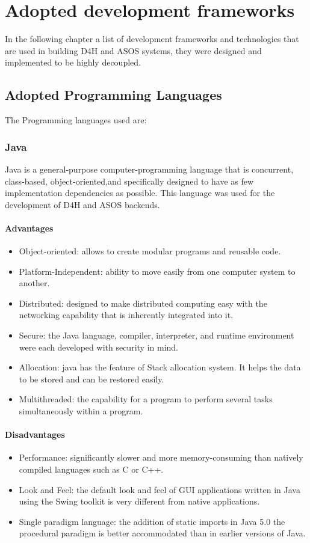 \documentclass[a4paper, hidelinks, 12pt]{report}
\begin{document}
	\chapter{Adopted development frameworks}
In the following chapter a list of development frameworks and technologies that are used in building  D4H and ASOS systems, they were designed and implemented to be highly decoupled.

	\section{Adopted Programming Languages}
	The Programming languages used are:

	\subsection{Java} Java is a general-purpose computer-programming language that is concurrent, class-based, object-oriented,and specifically designed to have as few implementation dependencies as possible. This language was used for the development of D4H and ASOS backends.

	\subsubsection{Advantages}
	\begin{itemize}
	\item{Object-oriented}: allows to create modular programs and reusable code.
	\item{Platform-Independent}: ability to move easily from one computer system to another.
		\item{Distributed}: designed to make distributed computing easy with the networking capability that is inherently integrated into it.
		\item{Secure}: the Java language, compiler, interpreter, and runtime environment were each developed with security in mind.
		\item{Allocation}: java has the feature of Stack allocation system. It helps the data to be stored and can be restored easily.
		\item{Multithreaded}: the capability for a program to perform several tasks simultaneously within a program.
	\end{itemize}

	\subsubsection{Disadvantages}
	\begin{itemize}
	\item{Performance}: significantly slower and more memory-consuming than natively compiled languages such as C or C++.
	\item{Look and Feel}: the default look and feel of GUI applications written in Java using the Swing toolkit is very different from native applications.
		\item{Single paradigm language}: the addition of static imports in Java 5.0 the procedural paradigm is better accommodated than in earlier versions of Java.
	\end{itemize}
\end{document}
